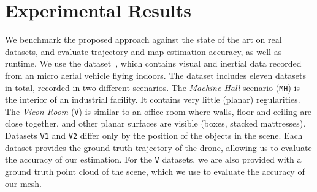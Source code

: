 
\section{Experimental Results}
\label{sec:results}

We benchmark the proposed approach against the state of the art on real datasets, and evaluate
 trajectory and map estimation accuracy, as well as runtime.
We use the \Euroc dataset~\cite{Burri15ijrr}, which contains visual and inertial data recorded from an micro aerial vehicle flying indoors.
The \Euroc dataset includes eleven datasets in total, recorded in two different scenarios.
The \textit{Machine Hall} scenario (\texttt{MH}) is the interior of an industrial facility.
It contains very little (planar) regularities.
The \textit{Vicon Room} (\texttt{V}) is similar to an office room where walls, floor and ceiling are close together, and other planar surfaces are visible
(boxes, stacked mattresses).
Datasets \texttt{V1} and \texttt{V2} differ only by the position of the objects in the scene.
Each dataset provides the ground truth trajectory of the drone, allowing us to evaluate the accuracy of our estimation.
For the \texttt{V} datasets, we are also provided with a ground truth point cloud of the scene, which we use to evaluate the accuracy of our mesh.

